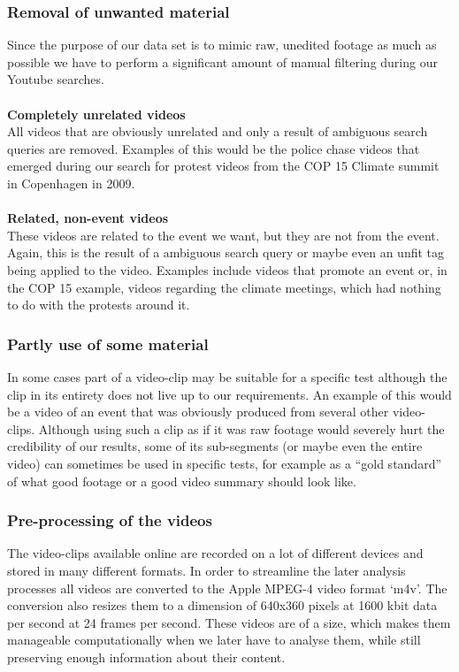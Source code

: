 \documentclass[12pt]{article}
\begin{document}
\subsubsection{Removal of unwanted material}
%
Since the purpose of our data set is to mimic raw, unedited footage as much as possible we have to perform a significant amount of manual filtering during our Youtube searches.\\\\
%
\textbf{Completely unrelated videos}\\
%
All videos that are obviously unrelated and only a result of ambiguous search queries are removed. Examples of this would be the police chase videos that emerged during our search for protest videos from the COP 15 Climate summit in Copenhagen in 2009.\\\\
%
\textbf{Related, non-event videos}\\
%
These videos are related to the event we want, but they are not from the event. Again, this is the result of a ambiguous search query or maybe even an unfit tag being applied to the video. Examples include videos that promote an event or, in the COP 15 example, videos regarding the climate meetings, which had nothing to do with the protests around it.
%
\subsubsection{Partly use of some material}
%
In some cases part of a video-clip may be suitable for a specific test although the clip in its entirety does not live up to our requirements. An example of this would be a video of an event that was obviously produced from several other video-clips. Although using such a clip as if it was raw footage would severely hurt the credibility of our results, some of its sub-segments (or maybe even the entire video) can sometimes be used in specific tests, for example as a “gold standard” of what good footage or a good video summary should look like.
\subsubsection{Pre-processing of the videos}
%
The video-clips available online are recorded on a lot of different devices and stored in many different formats. In order to streamline the later analysis processes all videos are converted to the Apple MPEG-4 video format ‘m4v’. The conversion also resizes them to a dimension of 640x360 pixels at 1600 kbit data per second at 24 frames per second. These videos are of a size, which makes them manageable computationally when we later have to analyse them, while still preserving enough information about their content. %
%
\end{document}
